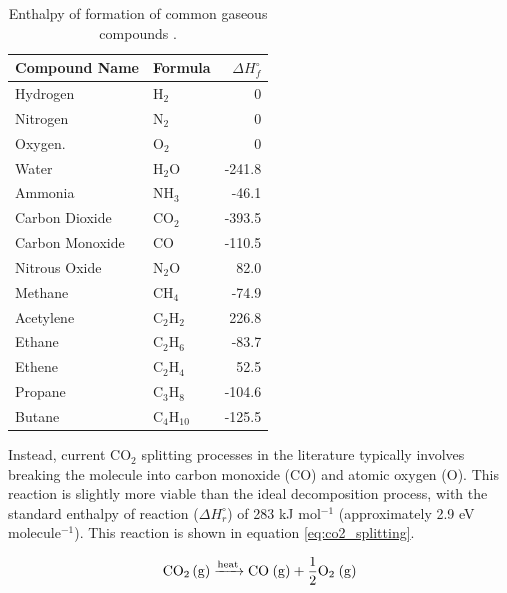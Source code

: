 \begin{table}[h!]
\centering
\caption{Enthalpy of formation of common gaseous compounds \cite{NIST_Chemistry_WebBook}.}
\begin{tabular}{llr}
\hline
\textbf{Compound Name} & \textbf{Formula} & \textbf{$\Delta H^\circ_f $} \\ \hline
Hydrogen               & H$_2$                     & 0           \\
Nitrogen               & N$_2$                     & 0           \\
Oxygen.                & O$_2$                     & 0           \\
Water                  & H$_2$O                    & -241.8      \\
Ammonia                & NH$_3$                    & -46.1       \\
Carbon Dioxide         & CO$_2$                    & -393.5      \\
Carbon Monoxide        & CO                        & -110.5      \\
Nitrous Oxide          & N$_2$O                    & 82.0        \\
Methane                & CH$_4$                    & -74.9       \\
Acetylene              & C$_2$H$_2$                & 226.8       \\
Ethane                 & C$_2$H$_6$                & -83.7       \\
Ethene                 & C$_2$H$_4$                & 52.5        \\
Propane                & C$_3$H$_8$                & -104.6      \\
Butane                 & C$_4$H$_{10}$             & -125.5      \\ 
\end{tabular}
\label{tb:enthaply_of_formation_of_compounds}
\end{table}


Instead, current CO$_2$ splitting processes in the literature typically involves breaking the molecule into carbon monoxide (CO) and atomic oxygen (O). This reaction is slightly more viable than the ideal decomposition process, with the standard enthalpy of reaction ($\Delta H^\circ_r$) of 283 kJ mol$^{-1}$ (approximately 2.9 eV molecule$^{-1}$). This reaction is shown in equation \ref{eq:co2_splitting}. 

\begin{equation}
    \ce{CO_2 (g) ->[heat] CO (g) + \frac{1}{2}O_2 (g)}
    \label{eq:co2_splitting}
\end{equation}

